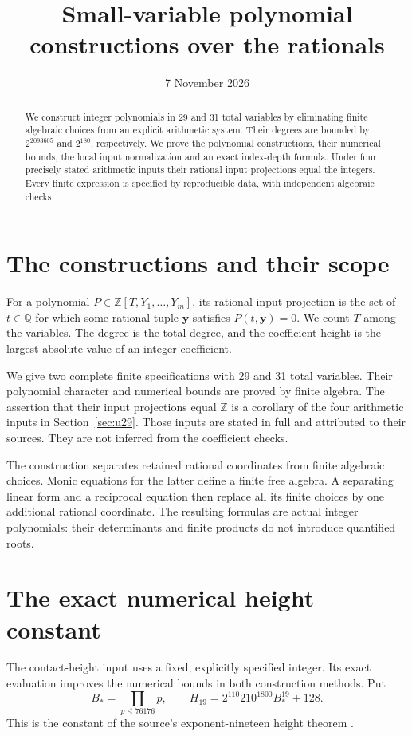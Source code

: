 \documentclass[11pt,a4paper]{article}
\title{Small-variable polynomial constructions over the rationals}
\author{}
\date{7 November 2026}
\theoremstyle{definition}
\theoremstyle{remark}
\begin{document}
\maketitle
\begin{abstract}
We construct integer polynomials in 29 and 31 total variables
by eliminating finite algebraic choices from an explicit arithmetic
system. Their degrees are bounded by $2^{2093605}$ and $2^{180}$,
respectively. We prove the polynomial constructions, their numerical
bounds, the local input normalization and an exact index-depth formula.
Under four precisely stated arithmetic inputs their rational input
projections equal the integers. Every finite expression is specified
by reproducible data, with independent algebraic checks.
\end{abstract}
\tableofcontents
\newpage
\section{The constructions and their scope}
For a polynomial $P\in\mathbb Z[T,Y_1,\ldots,Y_m]$, its rational
input projection is the set of $t\in\mathbb Q$ for which some rational
tuple $\mathbf y$ satisfies $P(t,\mathbf y)=0$. We count $T$ among the
variables. The degree is the total degree, and the coefficient height
is the largest absolute value of an integer coefficient.

We give two complete finite specifications with 29 and 31 total
variables. Their polynomial character and numerical bounds are proved
by finite algebra. The assertion that their input projections equal
$\mathbb Z$ is a corollary of the four arithmetic inputs in
Section~\ref{sec:u29}. Those inputs are stated in full and attributed
to their sources. They are not inferred from the coefficient checks.

The construction separates retained rational coordinates from finite
algebraic choices. Monic equations for the latter define a finite free
algebra. A separating linear form and a reciprocal equation then
replace all its finite choices by one additional rational coordinate.
The resulting formulas are actual integer polynomials: their
determinants and finite products do not introduce quantified roots.

\section{The exact numerical height constant}
\label{sec:exact-height-constant}

The contact-height input uses a fixed, explicitly specified integer.
Its exact evaluation improves the numerical bounds in both construction
methods. Put
\[
 B_*=\prod_{p\le76176}p,\qquad
 H_{19}=2^{110}210^{1800}B_*^{19}+128.
\]
This is the constant of the source's exponent-nineteen height theorem
\cite[Theorem \nolinkurl{thm:quartic-height19}]{RepositoryV9}.
\end{document}
